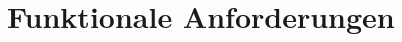 \documentclass[a4paper,10pt]{article}
\begin{document}
\section{Funktionale Anforderungen}
\end{document}
